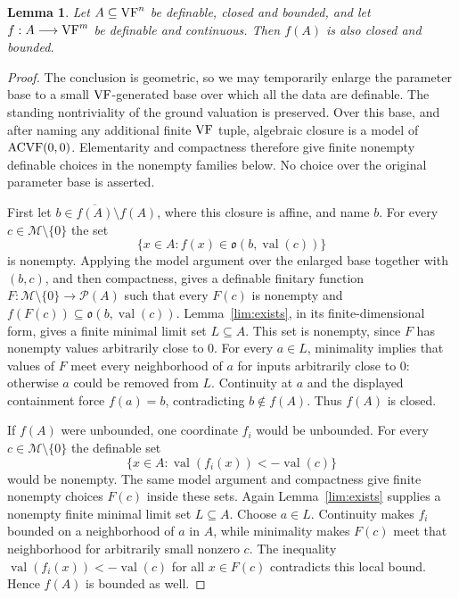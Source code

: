 \documentclass[12pt]{amsart}
\theoremstyle{plain}
\newtheorem{lem}[thm]{Lemma}
\theoremstyle{definition}
\theoremstyle{remark}
\numberwithin{equation}{section}
\theoremstyle{plain}
\newcommand{\VF}{\textup{VF}}
\newcommand{\ACVF}{\textup{ACVF}}
\newcommand{\MM}{\mdl M}
\newcommand{\go}{\mathfrak{o}}
\newcommand{\0}{\emptyset}
\newcommand{\mdl}[1]{\mathcal{#1}}  %
\newcommand{\fun}{\longrightarrow}
\DeclareMathOperator{\vv}{val}
\begin{document}
\begin{lem}\label{cb:to:cb}
Let $A\subseteq\VF^n$ be definable, closed and bounded, and let $f:A\fun\VF^m$ be definable and continuous. Then $f(A)$ is also closed and bounded.
\end{lem}
\begin{proof}
The conclusion is geometric, so we may temporarily enlarge the parameter base to a small $\VF$-generated base over which all the data are definable. The standing nontriviality of the ground valuation is preserved. Over this base, and after naming any additional finite $\VF$ tuple, algebraic closure is a model of $\ACVF(0,0)$. Elementarity and compactness therefore give finite nonempty definable choices in the nonempty families below. No choice over the original parameter base is asserted.

First let $b\in\overline{f(A)}\setminus f(A)$, where this closure is affine, and name $b$. For every $c\in\MM\setminus\{0\}$ the set
\[
\{x\in A:f(x)\in\go(b,\vv(c))\}
\]
is nonempty. Applying the model argument over the enlarged base together with $(b,c)$, and then compactness, gives a definable finitary function $F:\MM\setminus\{0\}\fun\mdl P(A)$ such that every $F(c)$ is nonempty and $f(F(c))\subseteq\go(b,\vv(c))$. Lemma~\ref{lim:exists}, in its finite-dimensional form, gives a finite minimal limit set $L\subseteq A$. This set is nonempty, since $F$ has nonempty values arbitrarily close to $0$. For every $a\in L$, minimality implies that values of $F$ meet every neighborhood of $a$ for inputs arbitrarily close to $0$: otherwise $a$ could be removed from $L$. Continuity at $a$ and the displayed containment force $f(a)=b$, contradicting $b\notin f(A)$. Thus $f(A)$ is closed.

If $f(A)$ were unbounded, one coordinate $f_i$ would be unbounded. For every $c\in\MM\setminus\{0\}$ the definable set
\[
\{x\in A:\vv(f_i(x))<-\vv(c)\}
\]
would be nonempty. The same model argument and compactness give finite nonempty choices $F(c)$ inside these sets. Again Lemma~\ref{lim:exists} supplies a nonempty finite minimal limit set $L\subseteq A$. Choose $a\in L$. Continuity makes $f_i$ bounded on a neighborhood of $a$ in $A$, while minimality makes $F(c)$ meet that neighborhood for arbitrarily small nonzero $c$. The inequality $\vv(f_i(x))<-\vv(c)$ for all $x\in F(c)$ contradicts this local bound. Hence $f(A)$ is bounded as well.
\end{proof}
\end{document}

